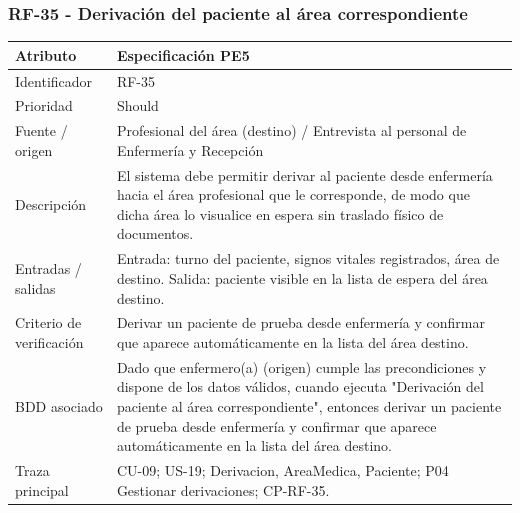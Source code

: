 \documentclass[11pt,a4paper]{article}
\begin{document}
	\subsubsection{RF-35 - Derivación del paciente al área correspondiente}
	\begin{tabularx}{\textwidth}{p{3.2cm}Y}
		\toprule
		\textbf{Atributo} & \textbf{Especificación PE5}\\\midrule
		Identificador & RF-35\\
		Prioridad & Should\\
		Fuente / origen & Profesional del área (destino) / Entrevista al personal de Enfermería y Recepción\\
		Descripción & El sistema debe permitir derivar al paciente desde enfermería hacia el área profesional que le corresponde, de modo que dicha área lo visualice en espera sin traslado físico de documentos.\\
		Entradas / salidas & Entrada: turno del paciente, signos vitales registrados, área de destino. Salida: paciente visible en la lista de espera del área destino.\\
		Criterio de verificación & Derivar un paciente de prueba desde enfermería y confirmar que aparece automáticamente en la lista del área destino.\\
		BDD asociado & Dado que enfermero(a) (origen) cumple las precondiciones y dispone de los datos válidos, cuando ejecuta "Derivación del paciente al área correspondiente", entonces derivar un paciente de prueba desde enfermería y confirmar que aparece automáticamente en la lista del área destino.\\
		Traza principal & CU-09; US-19; Derivacion, AreaMedica, Paciente; P04 Gestionar derivaciones; CP-RF-35.\\
		\bottomrule
	\end{tabularx}
\end{document}
